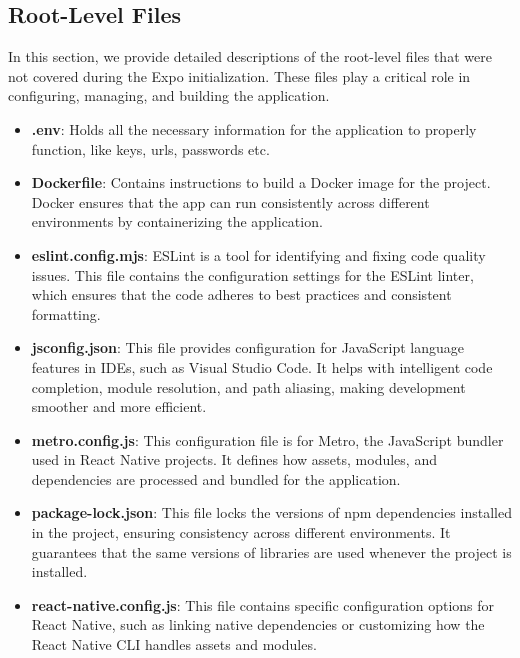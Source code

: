 \subsection{Root-Level Files}
In this section, we provide detailed descriptions of the root-level files that were not covered during the Expo initialization. These files play a critical role in configuring, managing, and building the application.

\begin{itemize}
    \item \textbf{.env}: Holds all the necessary information for the application to properly function, like keys, urls, passwords etc.

    \item \textbf{Dockerfile}: Contains instructions to build a Docker image for the project. Docker ensures that the app can run consistently across different environments by containerizing the application.

    \item \textbf{eslint.config.mjs}: ESLint is a tool for identifying and fixing code quality issues. This file contains the configuration settings for the ESLint linter, which ensures that the code adheres to best practices and consistent formatting.

    \item \textbf{jsconfig.json}: This file provides configuration for JavaScript language features in IDEs, such as Visual Studio Code. It helps with intelligent code completion, module resolution, and path aliasing, making development smoother and more efficient.
    
    \item \textbf{metro.config.js}: This configuration file is for Metro, the JavaScript bundler used in React Native projects. It defines how assets, modules, and dependencies are processed and bundled for the application.

    \item \textbf{package-lock.json}: This file locks the versions of npm dependencies installed in the project, ensuring consistency across different environments. It guarantees that the same versions of libraries are used whenever the project is installed.

    \item \textbf{react-native.config.js}: This file contains specific configuration options for React Native, such as linking native dependencies or customizing how the React Native CLI handles assets and modules.
\end{itemize}

